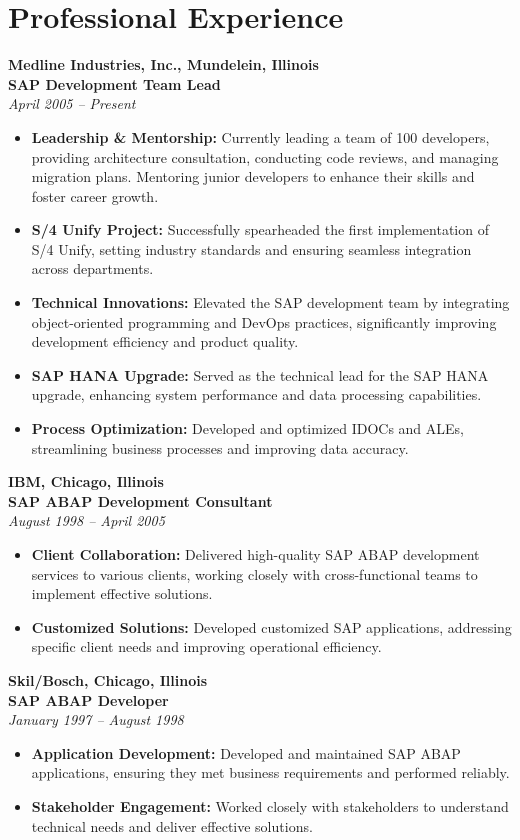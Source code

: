 \documentclass[a4paper,10pt]{article}
\begin{document}
\section*{Professional Experience}
\textbf{Medline Industries, Inc., Mundelein, Illinois} \\
\textbf{SAP Development Team Lead} \\
\textit{April 2005 – Present}
\begin{itemize}[leftmargin=2em]
    \item \textbf{Leadership \& Mentorship:} Currently leading a team of 100 developers, providing architecture consultation, conducting code reviews, and managing migration plans. Mentoring junior developers to enhance their skills and foster career growth.
    \item \textbf{S/4 Unify Project:} Successfully spearheaded the first implementation of S/4 Unify, setting industry standards and ensuring seamless integration across departments.
    \item \textbf{Technical Innovations:} Elevated the SAP development team by integrating object-oriented programming and DevOps practices, significantly improving development efficiency and product quality.
    \item \textbf{SAP HANA Upgrade:} Served as the technical lead for the SAP HANA upgrade, enhancing system performance and data processing capabilities.
    \item \textbf{Process Optimization:} Developed and optimized IDOCs and ALEs, streamlining business processes and improving data accuracy.
\end{itemize}

\textbf{IBM, Chicago, Illinois} \\
\textbf{SAP ABAP Development Consultant} \\
\textit{August 1998 – April 2005}
\begin{itemize}[leftmargin=2em]
    \item \textbf{Client Collaboration:} Delivered high-quality SAP ABAP development services to various clients, working closely with cross-functional teams to implement effective solutions.
    \item \textbf{Customized Solutions:} Developed customized SAP applications, addressing specific client needs and improving operational efficiency.
\end{itemize}

\textbf{Skil/Bosch, Chicago, Illinois} \\
\textbf{SAP ABAP Developer} \\
\textit{January 1997 – August 1998}
\begin{itemize}[leftmargin=2em]
    \item \textbf{Application Development:} Developed and maintained SAP ABAP applications, ensuring they met business requirements and performed reliably.
    \item \textbf{Stakeholder Engagement:} Worked closely with stakeholders to understand technical needs and deliver effective solutions.
\end{itemize}
\end{document}
